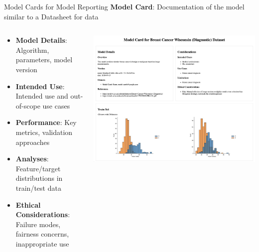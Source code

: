 \documentclass[10pt,compress,t,notes=noshow, xcolor=table]{beamer}
\begin{document}
\begin{frame}{Model Cards  for
  Model Reporting %
}
\label{model-cards}
\textbf{Model Card}: Documentation of the model similar to a Datasheet for data

\begin{columns}[T, totalwidth=\textwidth]
  \begin{column}{0.4\textwidth}
    \begin{itemize}
      \item \textbf{Model Details}: Algorithm, parameters, model version
      \item \textbf{Intended Use}: Intended use and out-of-scope use cases
      \item \textbf{Performance}: Key metrics, validation approaches
      \item \textbf{Analyses}: Feature/target distributions in train/test data
      \item \textbf{Ethical Considerations}: Failure modes, fairness concerns, inappropriate use
    \end{itemize}
  \end{column}
  \begin{column}{0.6\textwidth}
    \centering
    \includegraphics[width=\linewidth]{figure_man/modelcard.png}
  \end{column}
\end{columns}

\end{frame}
\end{document}
